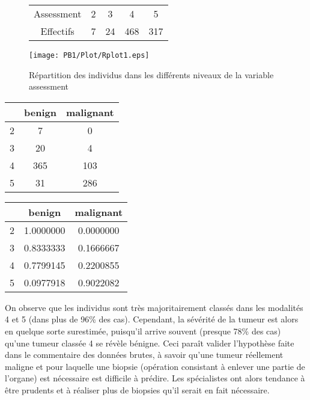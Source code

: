 \documentclass[a4paper]{report}
\begin{document}
\begin{figure}[!ht]

\begin{minipage}{.4\textwidth}\centering
\begin{tabular}{c|cccc}
Assessment & 2 &  3 &  4 &  5 \\ 
 Effectifs & 7 & 24 & 468 & 317 \\
\end{tabular}
\end{minipage}
\hfill
\begin{minipage}{.55\textwidth}\centering
\texttt{[image: PB1/Plot/Rplot1.eps]}
\end{minipage}
\caption{Répartition des individus dans les différents niveaux de la variable assessment }
\end{figure}



\begin{minipage}{.4\textwidth}\centering
\begin{tabular}{c|cc}
   & benign & malignant \\
   \hline
  2  & 7  &       0  \\
  3    &   20        & 4  \\
  4     & 365  &     103 \\
  5    &   31    &   286\\
\end{tabular}
\end{minipage}
\hfill
\begin{minipage}{.4\textwidth}\centering
\begin{tabular}{c|cc}
       & benign &malignant\\
       \hline
  2 &1.0000000 &0.0000000\\
  3& 0.8333333 &0.1666667\\
  4& 0.7799145 &0.2200855\\
  5 &0.0977918& 0.9022082\\
\end{tabular}
\label{tab}
\end{minipage}

On observe que les individus sont très majoritairement classés dans les modalités 4 et 5 (dans plus de 96\% des cas). Cependant, la sévérité de la tumeur est alors en quelque sorte surestimée, puisqu'il arrive souvent (presque 78\% des cas) qu'une tumeur classée 4 se révèle bénigne. Ceci paraît valider l'hypothèse faite dans le commentaire des données brutes, à savoir qu'une tumeur réellement maligne et pour laquelle une biopsie (opération consistant à enlever une partie de l'organe) est nécessaire est difficile à prédire. Les spécialistes ont alors tendance à être prudents et à réaliser plus de biopsies qu'il serait en fait nécessaire.   
\end{document}
